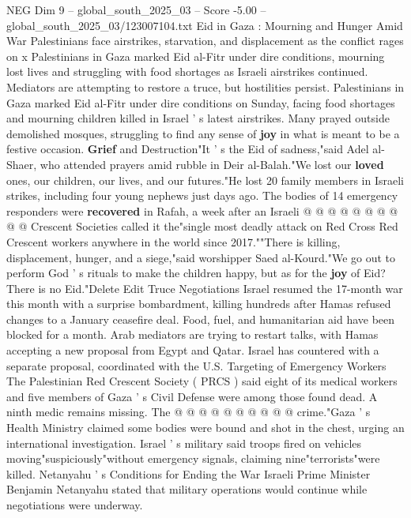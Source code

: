 \begin{textsample}{NEG Dim 9 – global\_south\_2025\_03 – Score -5.00 – global\_south\_2025\_03/123007104.txt}  \label{ex:f9_neg_394}
Eid in Gaza : Mourning and Hunger Amid War Palestinians face airstrikes, starvation, and displacement as the conflict rages on x Palestinians in Gaza marked Eid al-Fitr under dire conditions, mourning lost lives and struggling with food shortages as Israeli airstrikes continued.
Mediators are attempting to restore a truce, but hostilities persist.
Palestinians in Gaza marked Eid al-Fitr under dire conditions on Sunday, facing food shortages and mourning children killed in Israel ' s latest airstrikes.
Many prayed outside demolished mosques, struggling to find any sense of \textbf{joy} in what is meant to be a festive occasion. \textbf{Grief} and Destruction"It ' s the Eid of sadness,"said Adel al-Shaer, who attended prayers amid rubble in Deir al-Balah."We lost our \textbf{loved} ones, our children, our lives, and our futures."He lost 20 family members in Israeli strikes, including four young nephews just days ago.
The bodies of 14 emergency responders were \textbf{recovered} in Rafah, a week after an Israeli @ @ @ @ @ @ @ @ @ @ Crescent Societies called it the"single most deadly attack on Red Cross Red Crescent workers anywhere in the world since 2017.""There is killing, displacement, hunger, and a siege,"said worshipper Saed al-Kourd."We go out to perform God ' s rituals to make the children happy, but as for the \textbf{joy} of Eid?
There is no Eid."Delete Edit Truce Negotiations Israel resumed the 17-month war this month with a surprise bombardment, killing hundreds after Hamas refused changes to a January ceasefire deal.
Food, fuel, and humanitarian aid have been blocked for a month.
Arab mediators are trying to restart talks, with Hamas accepting a new proposal from Egypt and Qatar.
Israel has countered with a separate proposal, coordinated with the U.S.
Targeting of Emergency Workers The Palestinian Red Crescent Society ( PRCS ) said eight of its medical workers and five members of Gaza ' s Civil Defense were among those found dead.
A ninth medic remains missing.
The @ @ @ @ @ @ @ @ @ @ crime."Gaza ' s Health Ministry claimed some bodies were bound and shot in the chest, urging an international investigation.
Israel ' s military said troops fired on vehicles moving"suspiciously"without emergency signals, claiming nine"terrorists"were killed.
Netanyahu ' s Conditions for Ending the War Israeli Prime Minister Benjamin Netanyahu stated that military operations would continue while negotiations were underway.

\end{textsample}
